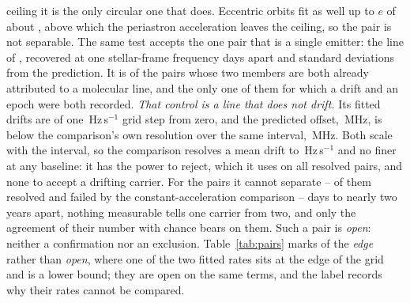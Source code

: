 ceiling it is the only circular one that does. Eccentric orbits fit as well
up to $e$ of about \ObEccMaxBp, above which the periastron acceleration
leaves the ceiling, so the pair is not separable. The same test accepts the one pair that is a single emitter: the
\TjCtlLine{} line of \TjCtlStar, recovered at one stellar-frame frequency
\TjCtlDtD{} days apart and \TjCtlNSig{} standard deviations from the
prediction. It is \TjNCandAttrTest{} of the \TjNCandAttr{} pairs whose two
members are both already attributed to a molecular line, and the only one of
them for which a drift and an epoch were both recorded. \emph{That control is a line
that does not drift.} Its fitted drifts are \TjCtlDriftStep{} of one
\TjCtlStepHzS\,Hz\,s$^{-1}$ grid step from zero, and the predicted offset,
\TjCtlPredMHz\,MHz, is below the comparison's own resolution over the same
interval, \TjCtlResMHz\,MHz. Both scale with the interval, so the comparison
resolves a mean drift to \TjCtlDriftResHzS\,Hz\,s$^{-1}$ and no finer at any
baseline: it has the power to reject, which it uses on all \TjNPower{}
resolved pairs, and none to accept a drifting carrier. For the \TjNOpen{} pairs
it cannot
separate -- \TjNPowerOpen{} of them resolved and failed by the
constant-acceleration comparison -- \TjDtOpenMinD{} days to nearly two years
apart, nothing measurable tells one carrier from two, and only the agreement
of their number with chance bears on them. Such a pair is \emph{open}:
neither a confirmation nor an exclusion. Table~\ref{tab:pairs} marks
\TjNPairEdge{} of the \TjNOpen{} \emph{edge} rather than \emph{open}, where
one of the two fitted rates sits at the edge of the grid and is a lower
bound; they are open on the same terms, and the label records why their
rates cannot be compared.


